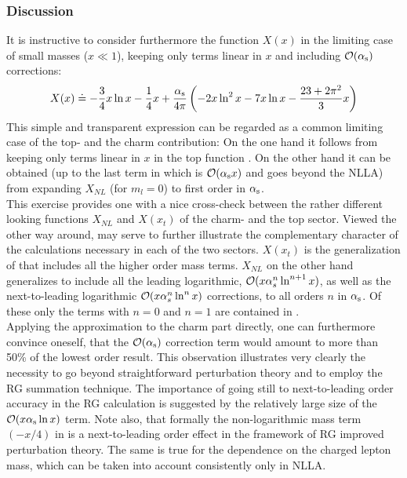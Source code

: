 \subsubsection{Discussion}
               \label{sec:HeffRareKB:kpnn:disc}
It is instructive to consider furthermore the function $X(x)$ in the
limiting case of small masses ($x\ll 1$), keeping only terms linear
in $x$ and including ${\cal O}(\alpha_{\rm s})$ corrections:
\begin{equation}\label{xxc} X(x)\doteq -{3\over 4}x\ln x-{1\over 4}x+
     \frac{\alpha_{\rm s}}{4 \pi}\left(-2x\ln^2 x-7x\ln x-{23+2\pi^2\over 3}x\right)  \end{equation}
This simple and transparent expression can be regarded as a common
limiting case of the top- and the charm contribution: On the one hand
it follows from keeping only terms linear in $x$ in the top function
. On the other hand it can be obtained
(up to the last term in  which is ${\cal O}(\alpha_{\rm s} x)$ and
goes beyond the NLLA) from expanding $X_{NL}$  (for $m_l=0$)
to first order in $\alpha_{\rm s}$.\\
This exercise provides one with a nice cross-check between the
rather different looking functions $X_{NL}$ and $X(x_t)$ of the
charm- and the top sector. Viewed the other way around,  may
serve to further illustrate the complementary character of the
calculations necessary in each of the two sectors. $X(x_t)$ is the
generalization of  that includes all the higher order mass terms.
$X_{NL}$ on the other hand generalizes  to include all the
leading logarithmic, ${\cal O}(x \alpha^n_s \ln^{n+1}x)$, as well as
the next-to-leading logarithmic ${\cal O}(x \alpha^n_s \ln^{n}x)$
corrections, to all orders $n$ in $\alpha_{\rm s}$. Of these only the terms
with $n=0$ and $n=1$ are contained in .\\
Applying the approximation  to the charm part directly, one can
furthermore convince oneself, that the ${\cal O}(\alpha_{\rm s})$
correction term would amount to more than 50\% of the lowest order
result. This observation illustrates very clearly the necessity to
go beyond straightforward perturbation theory and to employ the
RG summation technique. The importance of going still to
next-to-leading order accuracy in the RG calculation is suggested by the
relatively large size of the ${\cal O}(x \alpha_{\rm s} \ln x)$ term.
Note also, that formally the non-logarithmic mass term $(-x/4)$ in
 is a next-to-leading order effect in the framework of
RG improved perturbation theory. The same is true for the dependence
on the charged lepton mass, which can be taken into account
consistently only in NLLA.

